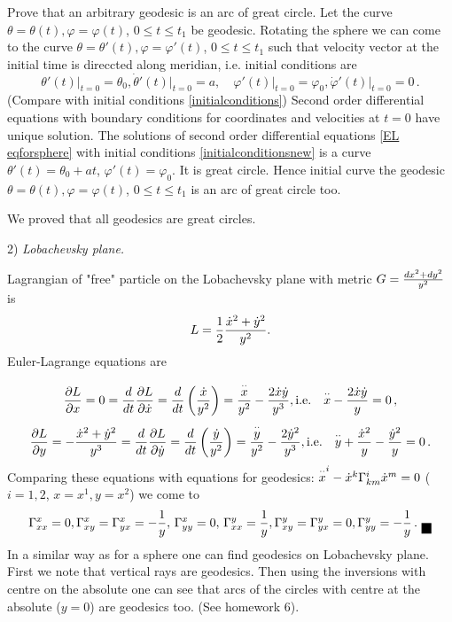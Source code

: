 \documentclass[12pt]{article}
\theoremstyle{theorem}
\numberwithin{equation}{section}
\begin{document}
{Prove that an arbitrary geodesic is an arc of great circle.
Let the curve $\theta=\theta(t),\varphi=\varphi(t)$,
$0\leq t\leq t_1$ be geodesic. Rotating the sphere
we can come to the curve $\theta=\theta'(t),\varphi=\varphi'(t)$, $0\leq t\leq t_1$
such that  velocity vector at the initial time is direccted along meridian, i.e.
initial conditions are
\begin{equation}\label{initialconditionsnew}
  \theta'(t)\big\vert_{t=0}=\theta_0, \dot\theta'(t)\big\vert_{t=0}=a,\quad
  \varphi'(t)\big\vert_{t=0}=\varphi_0, \dot\varphi'(t)\big\vert_{t=0}=0\,.
\end{equation}
(Compare with initial conditions \eqref{initialconditions})
Second order differential equations with boundary conditions for coordinates and velocities at $t=0$ have unique
solution. The solutions of second order differential equations \eqref{EL eqforsphere} with initial conditions
\eqref{initialconditionsnew} is a curve
                $\theta'(t)=\theta_0+at$, $\varphi'(t)=\varphi_0$. It is great circle.
                Hence initial curve the geodesic $\theta=\theta(t),\varphi=\varphi(t)$,
$0\leq t\leq t_1$ is an arc of great circle too.

We proved that all geodesics are great circles.


\m


2) {\it Lobachevsky plane.}


   Lagrangian of "free" particle on the Lobachevsky plane with metric $G={dx^2+dy^2\over y^2}$ is
      $$
   L={1\over 2}{\dot x^2+\dot y^2\over y^2}.
      $$
Euler-Lagrange equations are

  $$
  {\p L\over \p x}=0={d\over dt}{\p L\over \p \dot x}={d\over dt}\left({\dot x\over y^2}\right)=
            {{\buildrel \cdot\cdot\over x}\over y^2}-{2\dot x\dot y\over y^3}, {\rm i.e.}\quad
            {\buildrel \cdot\cdot\over x}-{2\dot x\dot y\over y}=0\,,
             $$
             $$
              {\p L\over \p y}=-{\dot x^2+\dot y^2\over y^3}=
              {d\over dt}{\p L\over \p \dot y}={d\over dt}\left({\dot y\over y^2}\right)=
            {{\buildrel \cdot\cdot\over y}\over y^2}-{2\dot y^2\over y^3}, {\rm i.e.}\quad
            {\buildrel \cdot\cdot\over y}+{\dot x^2\over y}-{\dot y^2\over y}=0\,.
            $$
Comparing these equations with equations for geodesics:
${\buildrel \cdot\cdot\over x^i}-\dot x^k\Gamma^i_{km}\dot x^m=0$
($i=1,2$, $x=x^1,y=x^2$) we come to
                $$
\Gamma^{x}_{xx}=0,
\Gamma^{x}_{xy}=\Gamma^{x}_{yx}=-{1\over y},\,
\Gamma^{x}_{yy}=0,\,\Gamma^{y}_{xx}={1\over y}, \Gamma^{y}_{xy}=\Gamma^{y}_{yx}=0, \Gamma^{y}_{yy}=-{1\over y}\,.
              \hbox{\finish}  $$
In  a similar way as for a sphere one can find geodesics on Lobachevsky plane.
First we note that vertical rays are geodesics.  Then using the inversions with centre on the absolute
one can see that arcs of the circles with centre at the absolute ($y=0$) are geodesics too.
(See homework 6).


}
\end{document}
